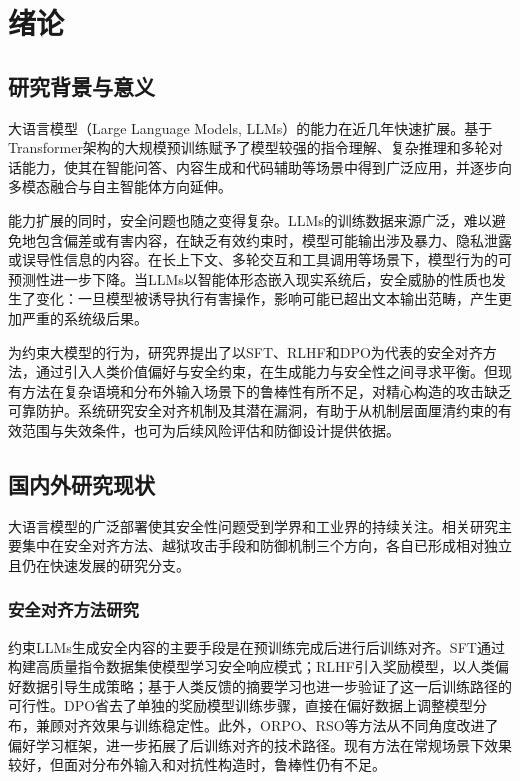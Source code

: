 
\chapter{绪论}

\section{研究背景与意义}

大语言模型（Large Language Models, LLMs）的能力在近几年快速扩展。基于Transformer架构的大规模预训练赋予了模型较强的指令理解、复杂推理和多轮对话能力，使其在智能问答、内容生成和代码辅助等场景中得到广泛应用，并逐步向多模态融合与自主智能体方向延伸\cite{vaswani2017attention}。

能力扩展的同时，安全问题也随之变得复杂。LLMs的训练数据来源广泛，难以避免地包含偏差或有害内容，在缺乏有效约束时，模型可能输出涉及暴力、隐私泄露或误导性信息的内容\cite{markov2022holistic}。在长上下文、多轮交互和工具调用等场景下，模型行为的可预测性进一步下降。当LLMs以智能体形态嵌入现实系统后，安全威胁的性质也发生了变化：一旦模型被诱导执行有害操作，影响可能已超出文本输出范畴，产生更加严重的系统级后果\cite{hagendorff2026jailbreakagents}。

为约束大模型的行为，研究界提出了以SFT、RLHF和DPO为代表的安全对齐方法\cite{ouyang2022instructgpt,rafailov2023dpo}\cite{hong2024orpo,christiano2017preferences}，通过引入人类价值偏好与安全约束，在生成能力与安全性之间寻求平衡。但现有方法在复杂语境和分布外输入场景下的鲁棒性有所不足，对精心构造的攻击缺乏可靠防护。系统研究安全对齐机制及其潜在漏洞，有助于从机制层面厘清约束的有效范围与失效条件，也可为后续风险评估和防御设计提供依据。

\section{国内外研究现状}

大语言模型的广泛部署使其安全性问题受到学界和工业界的持续关注。相关研究主要集中在安全对齐方法、越狱攻击手段和防御机制三个方向，各自已形成相对独立且仍在快速发展的研究分支\cite{liang2024surveycn,ren2025jailbreakdefensecn}。

\subsection{安全对齐方法研究}

约束LLMs生成安全内容的主要手段是在预训练完成后进行后训练对齐。SFT通过构建高质量指令数据集使模型学习安全响应模式；RLHF引入奖励模型，以人类偏好数据引导生成策略\cite{christiano2017preferences,ouyang2022instructgpt}；基于人类反馈的摘要学习也进一步验证了这一后训练路径的可行性\cite{stiennon2020summarize}。DPO省去了单独的奖励模型训练步骤，直接在偏好数据上调整模型分布，兼顾对齐效果与训练稳定性\cite{rafailov2023dpo}。此外，ORPO、RSO等方法从不同角度改进了偏好学习框架，进一步拓展了后训练对齐的技术路径\cite{hong2024orpo}。现有方法在常规场景下效果较好，但面对分布外输入和对抗性构造时，鲁棒性仍有不足。

